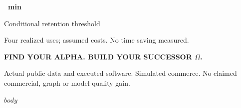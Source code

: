 \documentclass[10pt,a4paper]{article}
\begin{document}
\begin{titlepage}
\begin{minipage}[t]{0.31\textwidth}\raggedright
{\sffamily\fontsize{24}{26}\selectfont\bfseries\color{teal}\RetentionMinutes\ min}\par
{\sffamily\small Conditional retention threshold}\par
{\footnotesize Four realized uses; assumed costs. No time saving measured.}
\end{minipage}\par
\vspace{13mm}
{\sffamily\small\bfseries\color{teal}FIND YOUR ALPHA. BUILD YOUR SUCCESSOR \(\Omega\).}\par
{\footnotesize Actual public data and executed software. Simulated commerce. No claimed commercial, graph or model-quality gain.}
\end{titlepage}
\nopagecolor
\setcounter{page}{2}
$body$
\end{document}
